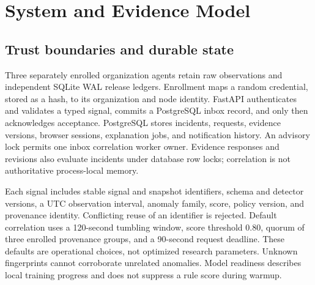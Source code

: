 \documentclass[conference,letterpaper]{IEEEtran}
\begin{document}
\section{System and Evidence Model}
\subsection{Trust boundaries and durable state}
Three separately enrolled organization agents retain raw observations and independent SQLite WAL release ledgers. Enrollment maps a random credential, stored as a hash, to its organization and node identity. FastAPI authenticates and validates a typed signal, commits a PostgreSQL inbox record, and only then acknowledges acceptance. PostgreSQL stores incidents, requests, evidence versions, browser sessions, explanation jobs, and notification history. An advisory lock permits one inbox correlation worker owner. Evidence responses and revisions also evaluate incidents under database row locks; correlation is not authoritative process-local memory.

Each signal includes stable signal and snapshot identifiers, schema and detector versions, a UTC observation interval, anomaly family, score, policy version, and provenance identity. Conflicting reuse of an identifier is rejected. Default correlation uses a 120-second tumbling window, score threshold 0.80, quorum of three enrolled provenance groups, and a 90-second request deadline. These defaults are operational choices, not optimized research parameters. Unknown fingerprints cannot corroborate unrelated anomalies. Model readiness describes local training progress and does not suppress a rule score during warmup.
\end{document}
